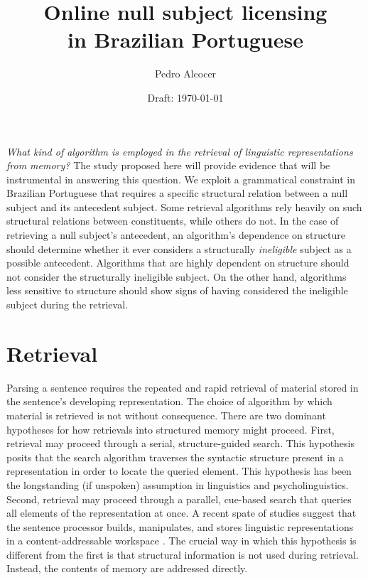 \documentclass[12pt,letterpaper]{article}
\title{Online null subject licensing\\ in Brazilian Portuguese}
\author{Pedro Alcocer}
\date{Draft: \today}
\begin{document}
\frenchspacing
\maketitle

\noindent \emph{What kind of algorithm is employed in the retrieval of linguistic representations from memory?} The study proposed here will provide evidence that will be instrumental in answering this question. We exploit a grammatical constraint in Brazilian Portuguese that requires a specific structural relation between a null subject and its antecedent subject. Some retrieval algorithms rely heavily on such structural relations between constituents, while others do not. In the case of retrieving a null subject's antecedent, an algorithm's dependence on structure should determine whether it ever considers a structurally \emph{ineligible} subject as a possible antecedent. Algorithms that are highly dependent on structure should not consider the structurally ineligible subject. On the other hand, algorithms less sensitive to structure should show signs of having considered the ineligible subject during the retrieval.

\section{Retrieval}

Parsing a sentence requires the repeated and rapid retrieval of material stored in the sentence's developing representation. The choice of algorithm by which material is retrieved is not without consequence. There are two dominant hypotheses for how retrievals into structured memory might proceed. First, retrieval may proceed through a serial, structure-guided search. This hypothesis posits that the search algorithm traverses the syntactic structure present in a representation in order to locate the queried element. This hypothesis has been the longstanding (if unspoken) assumption in linguistics and psycholinguistics. Second, retrieval may proceed through a parallel, cue-based search that queries all elements of the representation at once. A recent spate of studies suggest that the sentence processor builds, manipulates, and stores linguistic representations in a content-addressable workspace \citep{mcelree00, mcelree03, lewis05, lewis06}. The crucial way in which this hypothesis is different from the first is that structural information is not used during retrieval. Instead, the contents of memory are addressed directly.
\end{document}
